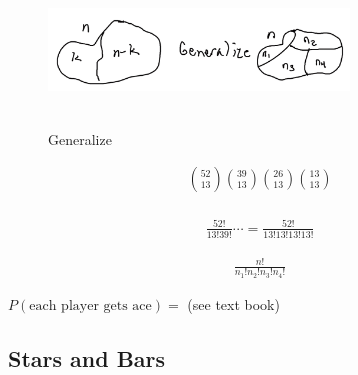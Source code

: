 
\begin{figure}[h]
\centering
\includegraphics[width=8cm, height=4cm]{images/L04/generalize.jpeg}
\caption{Generalize}
\end{figure}

\begin{align*}
\binom{52}{13}\binom{39}{13}\binom{26}{13}\binom{13}{13}\\
\end{align*}

\begin{align*}
    \frac{52!}{13!39!} \cdots = \frac{52!}{13!13!13!13!}
\end{align*}

\begin{align}
    \frac{n!}{n_1!n_2!n_3!n_4!}
\end{align}

$P(\text{each player gets ace}) = $ (see text book)

\subsection{Stars and Bars}
